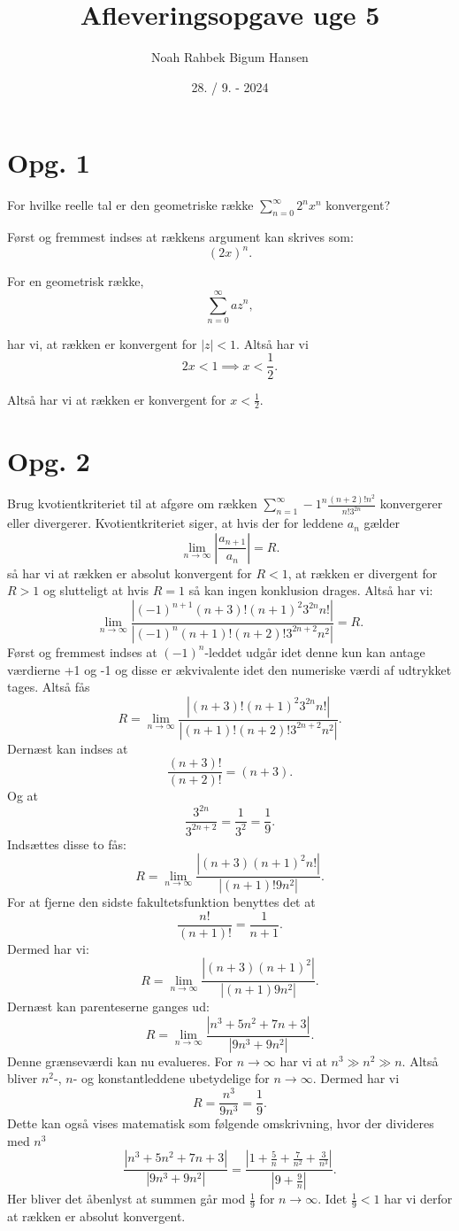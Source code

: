 \documentclass[12pt]{article}
\title{Afleveringsopgave uge 5}
\author{Noah Rahbek Bigum Hansen}
\date{28. / 9. - 2024}
\begin{document}
\maketitle

\section*{Opg. 1}

For hvilke reelle tal er den geometriske række $\sum_{n=0}^{\infty} 2^nx^n$ konvergent?

\bigbreak

Først og fremmest indses at rækkens argument kan skrives som:
  \[
    \left( 2x \right)^n 
  .\] 


For en geometrisk række,
  \[
  \sum_{n=0}^{\infty} a z^n
  ,\] 


har vi, at rækken er konvergent for $|z|<1$. Altså har vi
   \[
  2x<1 \implies x < \frac{1}{2}
  .\] 

Altså har vi at rækken er konvergent for $x<\frac{1}{2}$.

\section*{Opg. 2}
Brug kvotientkriteriet til at afgøre om rækken $\sum_{n=1}^{\infty} -1^n \frac{(n+2)!n^2}{n!3^{2n}}$ konvergerer eller divergerer.
\bigbreak
Kvotientkriteriet siger, at hvis der for leddene $a_n$ gælder
\[
\lim_{n \to \infty} |\frac{a_{n+1}}{a_n}| = R
.\] 
så har vi at rækken er absolut konvergent for $R<1$, at rækken er divergent for  $R>1$ og slutteligt at hvis $R=1$ så kan ingen konklusion drages. Altså har vi:
\[
 \lim_{n \to \infty}  \frac{|(-1)^{n+1} \left( n+3 \right)!\left( n+1 \right)^2 3^{2n}n!|}{|(-1)^n \left( n+1 \right)!(n+2)!3^{2n+2}n^2|} = R
.\] 
Først og fremmest indses at $(-1)^n$-leddet udgår idet denne kun kan antage værdierne +1 og -1 og disse er ækvivalente idet den numeriske værdi af udtrykket tages. Altså fås
\[
R = \lim_{n \to \infty}  \frac{|\left( n+3 \right)!\left( n+1 \right)^2 3^{2n}n!|}{|\left( n+1 \right)!\left( n+2 \right)!3^{2n+2}n^2|}
.\]
Dernæst kan indses at
\[
\frac{\left( n+3 \right) !}{\left( n+2 \right) !} = \left( n+3 \right) 
.\] 
Og at
\[
\frac{3^{2n}}{3^{2n+2}} = \frac{1}{3^2} = \frac{1}{9}
.\] 
Indsættes disse to fås:
\[
R = \lim_{n \to \infty}  \frac{|\left( n+3 \right)\left( n+1 \right)^2 n!|}{|\left( n+1 \right)! 9 n^2|}
.\]
For at fjerne den sidste fakultetsfunktion benyttes det at
\[
\frac{n!}{\left( n+1 \right)!} = \frac{1}{n+1}
.\]
Dermed har vi:
\[
R = \lim_{n \to \infty} \frac{|(n+3)(n+1)^2|}{|\left( n+1 \right) 9n^2|}
.\] 
Dernæst kan parenteserne ganges ud:
\[
R = \lim_{n \to \infty} \frac{|n^3+5n^2+7n+3|}{|9n^3+9n^2|}
.\]
Denne grænseværdi kan nu evalueres. For $n \to \infty$ har vi at $n^3\gg n^2 \gg n$. Altså bliver $n^2$-,  $n$- og konstantleddene ubetydelige for  $n \to \infty$. Dermed har vi
\[
R = \frac{n^3}{9n^3} = \frac{1}{9}
.\] 
Dette kan også vises matematisk som følgende omskrivning, hvor der divideres med $n^3$
\[
  \frac{|n^3+5n^2+7n+3|}{|9n^3+9n^2|} = \frac{|1+\frac{5}{n}+\frac{7}{n^2}+\frac{3}{n^3}|}{|9+\frac{9}{n}|}
.\] 
Her bliver det åbenlyst at summen går mod $\frac{1}{9}$ for $n \to \infty$. Idet $\frac{1}{9}<1$ har vi derfor at rækken er absolut konvergent. 
\end{document}
